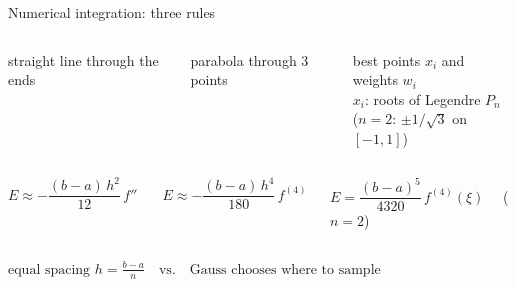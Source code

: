 \documentclass[aspectratio=169]{beamer}
\newcommand{\cbox}[2]{\colorbox{#1}{\ensuremath{\displaystyle #2}}}
\begin{document}
\begin{frame}{Numerical integration: three rules}
\vspace{0.3em}
\footnotesize
\begin{columns}[T]
\begin{column}{0.31\textwidth}\centering
straight line through the ends
\end{column}
\begin{column}{0.31\textwidth}\centering
parabola through 3 points
\end{column}
\begin{column}{0.31\textwidth}\centering
best points $x_i$ and weights $w_i$\\
\scriptsize $x_i$: roots of Legendre $P_n$\\
($n=2$: $\pm 1/\sqrt{3}$ on $[-1,1]$)
\end{column}
\end{columns}

\vspace{0.6em}
\begin{columns}[T]
\begin{column}{0.31\textwidth}\centering
$E \approx -\dfrac{(b-a)\,h^2}{12}\, f''(\xi)$
\end{column}
\begin{column}{0.31\textwidth}\centering
$E \approx -\dfrac{(b-a)\,h^4}{180}\, f^{(4)}(\xi)$
\end{column}
\begin{column}{0.31\textwidth}\centering
$E = \dfrac{(b-a)^5}{4320}\, f^{(4)}(\xi)$ \ \ ($n=2$)
\end{column}
\end{columns}

\vspace{0.6em}
\centering
\cbox{accent!12}{\text{equal spacing } h = \tfrac{b-a}{n} \quad\text{vs.}\quad \text{Gauss chooses where to sample}}
\end{frame}
\end{document}
